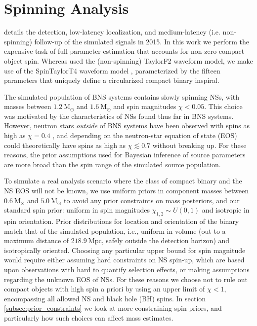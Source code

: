 \section{Spinning Analysis}
\label{sec:spin}

\citet{Singer_2014} details the detection, low-latency localization, and medium-latency (i.e. non-spinning) follow-up of the simulated signals in 2015. In this work we perform the expensive task of full parameter estimation that accounts for non-zero compact object spin. Whereas \citet{Singer_2014} used the (non-spinning) TaylorF2 waveform model, we make use of the SpinTaylorT4 waveform model \citep{Buonanno_2003,Buonanno_2009}, parameterized by the fifteen parameters that uniquely define a circularized compact binary inspiral.

The simulated population of BNS systems contains slowly spinning NSs, with masses between $1.2~\mathrm{M}_\odot$ and $1.6~\mathrm{M}_\odot$ and spin magnitudes $\chi < 0.05$.  This choice was motivated by the characteristics of NSs found thus far in BNS systems. However, neutron stars \emph{outside} of BNS systems have been observed with spins as high as $\chi = 0.4$ \citep{Hessels_2006,Brown_2012}, and depending on the neutron-star equation of state (EOS) could theoretically have spins as high as $\chi \lesssim 0.7$ \citep{Lo_2011} without breaking up.  For these reasons, the prior assumptions used for Bayesian inference of source parameters are more broad than the spin range of the simulated source population.

To simulate a real analysis scenario where the class of compact binary and the NS EOS will not be known, we use uniform priors in component masses between $0.6~\mathrm{M}_\odot$ and $5.0~\mathrm{M}_\odot$ to avoid any prior constraints on mass posteriors, and our standard spin prior: uniform in spin magnitudes $\chi_{1,2} \sim U(0, 1)$ and isotropic in spin orientation. Prior distributions for location and orientation of the binary match that of the simulated population, i.e., uniform in volume (out to a maximum distance of $218.9~\mathrm{Mpc}$, safely outside the detection horizon) and isotropically oriented.  Choosing any particular upper bound for spin magnitude would require either assuming hard constraints on NS spin-up, which are based upon observations with hard to quantify selection effects, or making assumptions regarding the unknown EOS of NSs. For these reasons we choose not to rule out compact objects with high spin a priori by using an upper limit of $\chi < 1$, encompassing all allowed NS and black hole (BH) spins.  In section \ref{subsec:prior_constraints} we look at more constraining spin priors, and particularly how such choices can affect mass estimates.
  
  
  
  
  
  
  
  